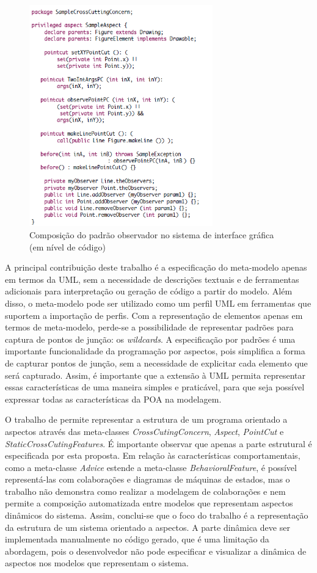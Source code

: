 \begin{figure}
	\centering
	\includegraphics[width=300px]{img/p21_code.png}
	\caption{Composição do padrão observador no sistema de interface gráfica (em nível de código)}\label{fig:p21_code}
\end{figure}

A principal contribuição deste trabalho é a especificação do meta-modelo apenas em termos da UML, sem a necessidade de descrições textuais e de
ferramentas adicionais para interpretação ou geração de código a partir do modelo. Além disso, o meta-modelo pode ser utilizado como um perfil UML em
ferramentas que suportem a importação de perfis. Com a representação de elementos apenas em termos de meta-modelo, perde-se a possibilidade de
representar padrões para captura de pontos de junção: os \textit{wildcards}. A especificação por padrões é uma importante
funcionalidade da programação por aspectos, pois simplifica a forma de capturar pontos de junção, sem a necessidade de explicitar cada elemento que
será capturado. Assim, é importante que a extensão à UML permita representar essas características de uma maneira simples e praticável, para que seja
possível expressar todas as características da POA na modelagem.

O trabalho de \cite{Evermann:2007:MSP:1229375.1229379} permite representar a estrutura de um programa orientado a aspectos através das meta-classes
\textit{CrossCutingConcern}, \textit{Aspect}, \textit{PointCut} e \textit{StaticCrossCutingFeatures}. É importante observar que apenas a parte
estrutural é especificada por esta proposta. Em relação às características comportamentais, como a meta-classe \textit{Advice} estende a meta-classe
\textit{BehavioralFeature}, é possível representá-las com colaborações e diagramas de máquinas de estados, mas o trabalho não demonstra como realizar
a modelagem de colaborações e nem permite a composição automatizada entre modelos que representam aspectos dinâmicos do sistema. Assim, conclui-se que
o foco do trabalho é a representação da estrutura de um sistema orientado a aspectos. A parte dinâmica deve ser implementada manualmente no código
gerado, que é uma limitação da abordagem, pois o desenvolvedor não pode especificar e visualizar a dinâmica de aspectos nos modelos que
representam o sistema.

